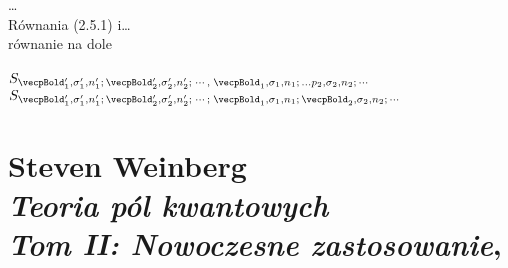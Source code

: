 \documentclass[a4paper,11pt]{article}
\numberwithin{equation}{section}
\begin{document}
\VerSpaceTwo


\noindent
{} \ldots \\
 Równania (2.5.1) i\ldots \\
 równanie na dole \\
 \\
\Jest $S_{ \vecpBold_{ 1 }', \sigma_{ 1 }', n_{ 1 }'; \, \vecpBold_{ 2 }',
  \sigma_{ 2 }', n_{ 2 }';\; \cdots, \; \vecpBold_{ 1 }, \sigma_{ 1 },
  n_{ 1 } ; \, \ldots { p }_{ 2 }, \sigma_{ 2 }, n_{ 2 }; \, \cdots }$ \\[0.5em]
\PowinnoByc $S_{ \vecpBold_{ 1 }', \sigma_{ 1 }', n_{ 1 }'; \, \vecpBold_{ 2 }',
  \sigma_{ 2 }', n_{ 2 }';\; \cdots; \; \vecpBold_{ 1 }, \sigma_{ 1 },
  n_{ 1 } ; \, \vecpBold_{ 2 }, \sigma_{ 2 }, n_{ 2 }; \, \cdots }$ \\















\newpage

\section{ %
  Steven Weinberg \\
  \textit{Teoria pól kwantowych} \\
  \textit{Tom II: Nowoczesne zastosowanie},
  \cite{WeinbergTeoriaPolKwantowychNowoczesneZastosowania1999}}







\end{document}
